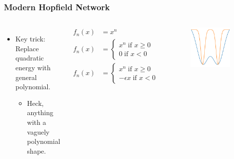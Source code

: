 
\begin{frame}
    \frametitle{Modern Hopfield Network}
    \begin{columns}[c]
        \begin{itemize}
            \item Key trick: Replace quadratic energy with general polynomial.
            \begin{itemize}
                \item Heck, anything with a vaguely polynomial shape.
            \end{itemize}
        \end{itemize}

        \begin{align*}
            f_n\left( x \right) &= x^n \\
            f_n\left( x \right) &= \begin{cases}
                x^n \; \text{if } x\geq0 \\
                0 \; \text{if } x<0
            \end{cases} \\
            f_n\left( x \right) &= \begin{cases}
                x^n \; \text{if } x\geq0 \\
                -\epsilon x \; \text{if } x<0
            \end{cases}
        \end{align*}

        \begin{figure}[h]
            \includegraphics[width=\textwidth]{images/introduction_energywell03.png}
        \end{figure}
    \end{columns}
\end{frame}

